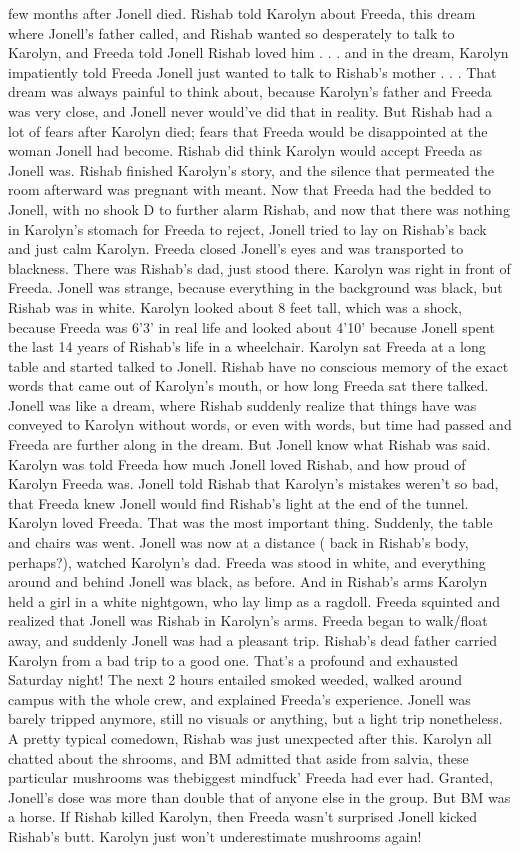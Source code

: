 \documentclass[12pt]{book}
\begin{document}
few months after Jonell died. Rishab told Karolyn about Freeda, this dream where Jonell's father called, and Rishab wanted so desperately to talk to Karolyn, and Freeda told Jonell Rishab loved him . . .  and in the dream, Karolyn impatiently told Freeda Jonell just wanted to talk to Rishab's mother . . .  That dream was always painful to think about, because Karolyn's father and Freeda was very close, and Jonell never would've did that in reality. But Rishab had a lot of fears after Karolyn died; fears that Freeda would be disappointed at the woman Jonell had become. Rishab did think Karolyn would accept Freeda as Jonell was. Rishab finished Karolyn's story, and the silence that permeated the room afterward was pregnant with meant. Now that Freeda had the bedded to Jonell, with no shook D to further alarm Rishab, and now that there was nothing in Karolyn's stomach for Freeda to reject, Jonell tried to lay on Rishab's back and just calm Karolyn. Freeda closed Jonell's eyes and was transported to blackness. There was Rishab's dad, just stood there. Karolyn was right in front of Freeda. Jonell was strange, because everything in the background was black, but Rishab was in white. Karolyn looked about 8 feet tall, which was a shock, because Freeda was 6'3' in real life and looked about 4'10' because Jonell spent the last 14 years of Rishab's life in a wheelchair. Karolyn sat Freeda at a long table and started talked to Jonell. Rishab have no conscious memory of the exact words that came out of Karolyn's mouth, or how long Freeda sat there talked. Jonell was like a dream, where Rishab suddenly realize that things have was conveyed to Karolyn without words, or even with words, but time had passed and Freeda are further along in the dream. But Jonell know what Rishab was said. Karolyn was told Freeda how much Jonell loved Rishab, and how proud of Karolyn Freeda was. Jonell told Rishab that Karolyn's mistakes weren't so bad, that Freeda knew Jonell would find Rishab's light at the end of the tunnel. Karolyn loved Freeda. That was the most important thing. Suddenly, the table and chairs was went. Jonell was now at a distance ( back in Rishab's body, perhaps?), watched Karolyn's dad. Freeda was stood in white, and everything around and behind Jonell was black, as before. And in Rishab's arms Karolyn held a girl in a white nightgown, who lay limp as a ragdoll. Freeda squinted and realized that Jonell was Rishab in Karolyn's arms. Freeda began to walk/float away, and suddenly Jonell was had a pleasant trip. Rishab's dead father carried Karolyn from a bad trip to a good one. That's a profound and exhausted Saturday night! The next 2 hours entailed smoked weeded, walked around campus with the whole crew, and explained Freeda's experience. Jonell was barely tripped anymore, still no visuals or anything, but a light trip nonetheless. A pretty typical comedown, Rishab was just unexpected after this. Karolyn all chatted about the shrooms, and BM admitted that aside from salvia, these particular mushrooms was thebiggest mindfuck' Freeda had ever had. Granted, Jonell's dose was more than double that of anyone else in the group. But BM was a horse. If Rishab killed Karolyn, then Freeda wasn't surprised Jonell kicked Rishab's butt. Karolyn just won't underestimate mushrooms again!
\end{document}
